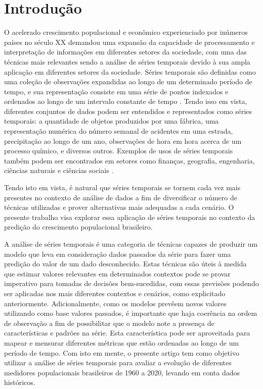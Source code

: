 \section{Introdução}

O acelerado crescimento populacional e econômico experienciado por inúmeros 
países no século XX demandou uma expansão da capacidade de processamento e 
interpretação de informações em diferentes setores da sociedade, com uma das 
técnicas mais relevantes sendo a análise de séries temporais devido à sua ampla 
aplicação em diferentes setores da sociedade. Séries temporais são definidas 
como uma coleção de observações expandidas ao longo de um determinado período 
de tempo, e sua representação consiste em uma série de pontos indexados e 
ordenados ao longo de um intervalo constante de tempo \cite{BOX:1}. Tendo isso em vista, 
diferentes conjuntos de dados podem ser entendidos e representados como séries 
temporais: a quantidade de objetos produzidos por uma fábrica, uma representação 
numérica do número semanal de acidentes em uma estrada, precipitação ao longo 
de um ano, observações de hora em hora acerca de um processo químico, e 
diversos outros. Exemplos de usos de séries temporais também podem ser encontrados 
em setores como finanças, geografia, engenharia, ciências naturais e ciências sociais \cite{WEIGEND:2}.

Tendo isto em vista, é natural que séries temporais se tornem cada vez mais presentes 
no contexto de análise de dados a fim de diversificar o número de técnicas utilizadas 
e prover alternativas mais adequadas a cada cenário. O presente trabalho visa explorar 
essa aplicação de séries temporais no contexto da predição do crescimento populacional 
brasileiro.

A análise de séries temporais é uma categoria de técnicas capazes de produzir um modelo 
que leva em consideração dados passados da série para fazer uma predição do valor de 
um dado desconhecido. Estas técnicas são úteis à medida que estimar valores relevantes 
em determinados contextos pode se provar imperativo para tomadas de decisões bem-sucedidas, 
com essas previsões podendo ser aplicadas nos mais diferentes contextos e cenários, como 
explicitado anteriormente. Adicionalmente, como os modelos prevêem novos valores utilizando 
como base valores passados, é importante que haja coerência na ordem de observação a fim 
de possibilitar que o modelo note a presença de características e padrões na série. 
Esta característica pode ser aproveitada para mapear e mensurar diferentes métricas 
que estão ordenadas ao longo de um período de tempo. Com isto em mente, o presente 
artigo tem como objetivo utilizar a análise de séries temporais para avaliar a evolução 
de diferentes medidores populacionais brasileiros de 1960 a 2020, levando em conta dados 
históricos.

